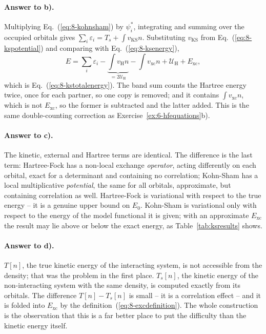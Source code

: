 \paragraph{Answer to b).}
Multiplying Eq.~(\ref{eq:8-kohnsham}) by $\psi_i^{*}$, integrating and
summing over the occupied orbitals gives
$\sum_i\varepsilon_i=T_s+\int v_{\mathrm{KS}}n$.  Substituting
$v_{\mathrm{KS}}$ from Eq.~(\ref{eq:8-kspotential}) and comparing with
Eq.~(\ref{eq:8-ksenergy}),
\begin{equation}
  E = \sum_i\varepsilon_i
    - \underbrace{\int v_{\mathrm{H}}n}_{=2\mathcal{U}_{\mathrm{H}}}
    - \int v_{\mathrm{xc}}n
    + \mathcal{U}_{\mathrm{H}} + E_{\mathrm{xc}} ,
  \label{eq:8-exb4}
\end{equation}
which is Eq.~(\ref{eq:8-kstotalenergy}).  The band sum counts the Hartree
energy twice, once for each partner, so one copy is removed; and it contains
$\int v_{\mathrm{xc}}n$, which is not $E_{\mathrm{xc}}$, so the former is
subtracted and the latter added.  This is the same double-counting
correction as Exercise~\ref{ex:6-hfequations}b).

\paragraph{Answer to c).}
The kinetic, external and Hartree terms are identical.  The difference is the
last term: Hartree-Fock has a non-local exchange \emph{operator}, acting
differently on each orbital, exact for a determinant and containing no
correlation; Kohn-Sham has a local multiplicative \emph{potential}, the same
for all orbitals, approximate, but containing correlation as well.
Hartree-Fock is variational with respect to the true energy -- it is a
genuine upper bound on $E_0$.  Kohn-Sham is variational only with respect to
the energy of the model functional it is given; with an approximate
$E_{\mathrm{xc}}$ the result may lie above or below the exact energy, as
Table~\ref{tab:ksresults} shows.

\paragraph{Answer to d).}
$T[n]$, the true kinetic energy of the interacting system, is not accessible
from the density; that was the problem in the first place.  $T_s[n]$, the
kinetic energy of the non-interacting system with the same density, is
computed exactly from its orbitals.  The difference $T[n]-T_s[n]$ is small --
it is a correlation effect -- and it is folded into $E_{\mathrm{xc}}$ by the
definition~(\ref{eq:8-excdefinition}).  The whole construction is the
observation that this is a far better place to put the difficulty than the
kinetic energy itself.


